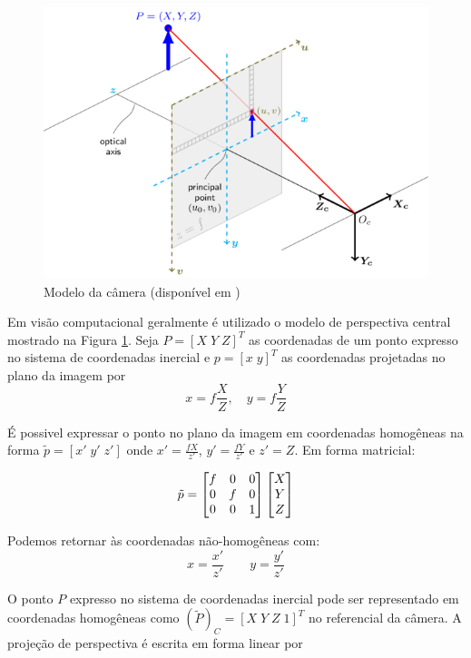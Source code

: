 \begin{figure}[h!]
  \centering
  \includegraphics[width=0.8\linewidth]{./img/camera_model3.png}
\caption{Modelo da câmera (disponível em \citep{opencvCameraCalibration})}
\label{fig:camera_model}
\end{figure}

Em visão computacional geralmente é utilizado o modelo de perspectiva central mostrado na Figura \ref{fig:camera_model}.
Seja ${P} = [X\; Y\; Z]^T$ as coordenadas de um ponto expresso no sistema de coordenadas inercial e ${p} = [x\;y]^T$ as coordenadas projetadas no plano da imagem por
\begin{equation}
x = f \frac{X}{Z}, \quad y = f \frac{Y}{Z}
\end{equation}

É possivel expressar o ponto no plano da imagem em coordenadas homogêneas na forma $\tilde{{p}} = [x'\; y' \; z']$ onde $x' = \frac{fX}{z'}$, $y' = \frac{fY}{z'}$ e $z' = Z$. Em forma matricial:

\begin{equation}
{\tilde{p}} = 
\begin{bmatrix} f & 0 & 0 \\
	 0 & f & 0 \\
	 0 & 0 & 1	
\end{bmatrix}
\begin{bmatrix}X\\Y\\Z\end{bmatrix}
\end{equation}

Podemos retornar às coordenadas não-homogêneas com:
\[ x = \frac{x'}{z'} \qquad y = \frac{y'}{z'}\]

O ponto ${P}$ expresso no sistema de coordenadas inercial pode ser representado em coordenadas homogêneas como $({\tilde{P}})_C = [X \; Y \; Z \; 1]^T$ no referencial da câmera. A projeção de perspectiva é escrita em forma linear por 

